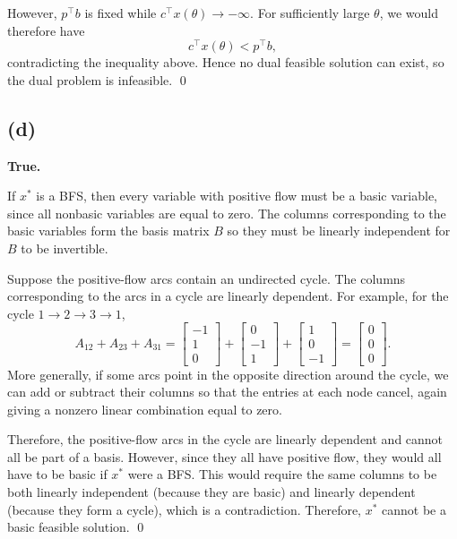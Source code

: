 \documentclass{article}
\begin{document}
However, $p^\top b$ is fixed while $
c^\top x(\theta)\to-\infty.
$
For sufficiently large $\theta$, we would therefore have
\[
c^\top x(\theta)<p^\top b,
\]
contradicting the inequality above. Hence no dual feasible solution can
exist, so the dual problem is infeasible. \qed



\vspace{5mm}
\subsection*{(d)}

\textbf{True.}

If $x^*$ is a BFS, then every variable with positive flow must be a
basic variable, since all nonbasic variables are equal to zero. The columns corresponding to the basic variables form the basis matrix \(B\) so they must be linearly independent for \(B\) to be invertible.


Suppose the positive-flow arcs contain an undirected cycle. The columns
corresponding to the arcs in a cycle are linearly dependent. For example, for the cycle $1\to2\to3\to1$,
\[
A_{12}+A_{23}+A_{31}
=
\begin{bmatrix}
-1\\
1\\
0
\end{bmatrix}
+
\begin{bmatrix}
0\\
-1\\
1
\end{bmatrix}
+
\begin{bmatrix}
1\\
0\\
-1
\end{bmatrix}
=
\begin{bmatrix}
0\\
0\\
0
\end{bmatrix}.
\]
More generally, if some arcs point in the opposite direction around the
cycle, we can add or subtract their columns so that the entries at each
node cancel, again giving a nonzero linear combination equal to zero.

Therefore, the positive-flow arcs in the cycle are linearly dependent and cannot all be part of a basis. However, since they all have positive flow, they would all have to be basic if \(x^*\) were a BFS. This would require the same columns to be both linearly independent (because they are basic) and linearly dependent (because they form a cycle), which is a contradiction. Therefore, \(x^*\) cannot be a basic feasible solution. \qed
\end{document}
